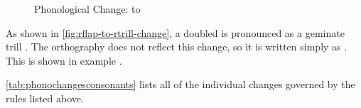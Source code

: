 \begin{figure}[h]\centering
	\caption{Phonological Change:  to }
	\label{fig:rflap-to-rtrill-change}
\end{figure}

As shown in \autoref{fig:rflap-to-rtrill-change}, a doubled  is pronounced as a geminate trill . The orthography does not reflect this change, so it is written simply as . This is shown in example .

\ex[exno=\getref{gemr}]
	   
\xe

\autoref{tab:phonochangesconsonants} lists all of the individual changes governed by the rules listed above.

